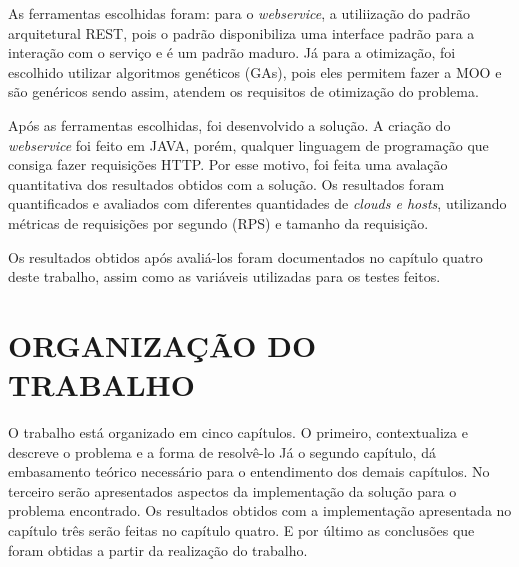 As ferramentas escolhidas foram: para o \textit{webservice}, 
a utiliização do padrão arquitetural REST, pois o padrão disponibiliza
uma interface padrão para a interação com o serviço e é um padrão maduro. Já para 
a otimização, foi escolhido utilizar algoritmos genéticos (GAs), pois eles permitem 
fazer a MOO e são genéricos sendo assim, atendem os requisitos de otimização do problema.

Após as ferramentas escolhidas, foi desenvolvido a solução. A criação do \textit{webservice} foi 
feito em JAVA, porém, qualquer linguagem de programação que consiga fazer requisições HTTP.
Por esse motivo, foi feita uma avalação quantitativa dos resultados obtidos com a solução.
Os resultados foram quantificados e avaliados com diferentes quantidades de \textit{clouds e hosts},
utilizando métricas de requisições por segundo (RPS) e tamanho da requisição.

Os resultados obtidos após avaliá-los foram documentados no capítulo quatro
deste trabalho, assim como as variáveis utilizadas para os testes feitos.

\section{ORGANIZAÇÃO DO TRABALHO}
\label{sec:organizacaoTrabalho}

O trabalho está organizado em cinco capítulos. O primeiro, contextualiza e descreve o problema e a forma de resolvê-lo
Já o segundo capítulo, dá embasamento teórico necessário para o entendimento dos demais capítulos.
No terceiro serão apresentados aspectos da implementação da solução para o problema encontrado. 
Os resultados obtidos com a implementação apresentada no capítulo três serão feitas no capítulo quatro. 
E por último as conclusões que foram obtidas a partir da realização do trabalho.
